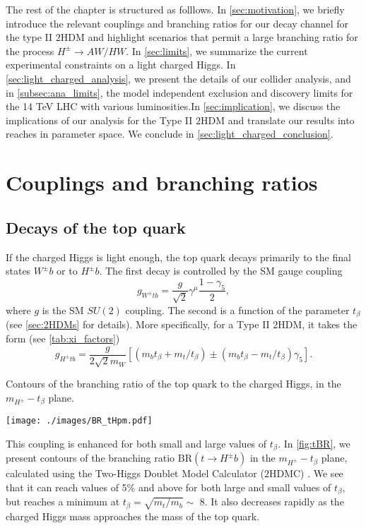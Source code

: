 The rest of the chapter is structured as folllows. In \autoref{sec:motivation}, we briefly introduce the relevant couplings and branching ratios for our decay channel for the type II $2$HDM and highlight scenarios that permit a large branching ratio for the process $H^{\pm} \rightarrow AW/HW$. In \autoref{sec:limits}, we summarize the current experimental constraints on a light charged Higgs. In \autoref{sec:light_charged_analysis}, we present the details of our collider analysis, and in \autoref{subsec:ana_limits}, the model independent exclusion and discovery limits for the 14 TeV LHC with various luminosities.In \autoref{sec:implication}, we discuss the implications of our analysis for the Type II $2$HDM and translate our results into reaches in parameter space. We conclude in \autoref{sec:light_charged_conclusion}.
 
\section{Couplings and branching ratios} \label{sec:motivation}

\subsection{Decays of the top quark}
If the charged Higgs is light enough, the top quark decays primarily to the final states $W^\pm b$ or to $H^{\pm}b$. The first decay is controlled by the SM gauge coupling
\begin{equation}
g_{W^{\pm} tb} = \frac{g}{\sqrt{2}} \gamma^\mu \frac{1-\gamma_5}{2}, 
\end{equation}
where $g$ is the SM $SU(2)$ coupling. The second is a function of the parameter $t_{\beta}$ (see \autoref{sec:2HDMs} for details). More specifically, for a Type II $2$HDM, it takes the form (see \autoref{tab:xi_factors}) 
\begin{equation}
g_{H^{\pm} tb} = \frac{g}{2 \sqrt{2} m_W} \left[ (m_b t_{\beta} + m_t /t_\beta) \pm (m_b t_{\beta} - m_t /t_\beta ) \gamma_5 \right].
\end{equation}
\begin{marginfigure}[-1cm]
\centering
    \caption{Contours of the branching ratio of the top quark to the charged Higgs, in the $m_{H^{\pm}}-t_{\beta}$ plane.}
    \texttt{[image: ./images/BR\_tHpm.pdf]}
\label{fig:tBR}
\end{marginfigure}
\noindent This coupling is enhanced for both small and large values of $t_{\beta}$. In \autoref{fig:tBR}, we present contours of the branching ratio BR$(t \rightarrow H^{\pm} b)$ in the $m_{H^{\pm}}-t_{\beta}$ plane, calculated using the Two-Higgs Doublet Model Calculator ($2$HDMC) \cite{Eriksson:2009ws}. We see that it can reach values of 5\% and above for both large and small values of $t_{\beta}$, but reaches a minimum at $t_{\beta} = \sqrt{m_t/m_b}\sim$ 8. It also decreases rapidly as the charged Higgs mass approaches the mass of the top quark.

